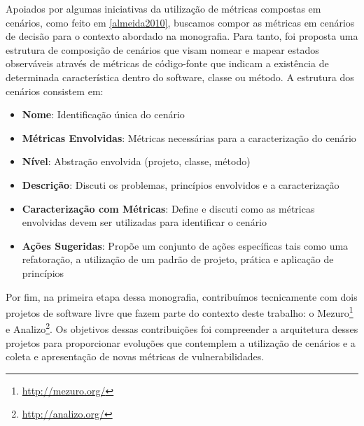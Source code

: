 Apoiados por algumas iniciativas da utilização de métricas compostas em cenários, como feito em \ref{almeida2010}, buscamos compor as métricas em cenários de decisão para o contexto abordado na monografia. Para tanto, foi proposta uma estrutura de composição de cenários que visam nomear e mapear estados observáveis através de métricas de código-fonte que indicam a existência de determinada característica dentro do software, classe ou método. A estrutura dos cenários consistem em:
\begin{itemize}
\item \textbf{Nome}: Identificação única do cenário
\item \textbf{Métricas Envolvidas}: Métricas necessárias para a caracterização do cenário
\item \textbf{Nível}: Abstração envolvida (projeto, classe, método)
\item \textbf{Descrição}: Discuti os problemas, princípios envolvidos e a caracterização
\item \textbf{Caracterização com Métricas}: Define e discuti como as métricas envolvidas devem ser utilizadas para identificar o cenário
\item \textbf{Ações Sugeridas}: Propõe um conjunto de ações específicas tais como uma refatoração, a utilização de um padrão de projeto, prática e aplicação de princípios
\end{itemize}

Por fim, na primeira etapa dessa monografia, contribuímos tecnicamente com dois projetos de software livre que fazem parte do contexto deste trabalho: o Mezuro\footnote{\url{http://mezuro.org/}} e Analizo\footnote{\url{http://analizo.org/}}. Os objetivos dessas contribuições foi compreender a arquitetura desses projetos para proporcionar evoluções que contemplem a utilização de cenários e a coleta e apresentação de novas métricas de vulnerabilidades.

   
